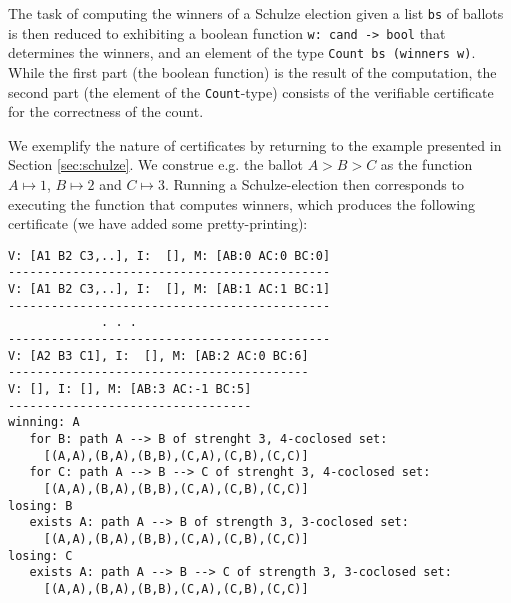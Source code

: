 \documentclass{llncs}
\begin{document}
The task of computing the winners of a Schulze election given a list
\texttt{bs} of ballots is then
reduced to exhibiting a boolean function \texttt{w: cand -> bool}
that determines the winners, and an element of the type
\texttt{Count bs (winners w)}. While the first part (the boolean
function) is the result of the computation, the second part (the
element of the \texttt{Count}-type) consists of the verifiable
certificate for the correctness of the count.

We exemplify the nature of certificates by returning to the example
presented in Section \ref{sec:schulze}. We construe e.g. the ballot
$A > B > C$ as the function $A \mapsto 1$, $B \mapsto 2$ and $C
\mapsto 3$. Running a Schulze-election then corresponds to executing
the function that computes winners, which produces the following
certificate (we have added some pretty-printing):

\begin{verbatim}
V: [A1 B2 C3,..], I:  [], M: [AB:0 AC:0 BC:0]
---------------------------------------------
V: [A1 B2 C3,..], I:  [], M: [AB:1 AC:1 BC:1]
---------------------------------------------
             . . .
---------------------------------------------
V: [A2 B3 C1], I:  [], M: [AB:2 AC:0 BC:6]
------------------------------------------
V: [], I: [], M: [AB:3 AC:-1 BC:5]
----------------------------------
winning: A
   for B: path A --> B of strenght 3, 4-coclosed set:
     [(A,A),(B,A),(B,B),(C,A),(C,B),(C,C)]
   for C: path A --> B --> C of strenght 3, 4-coclosed set:
     [(A,A),(B,A),(B,B),(C,A),(C,B),(C,C)] 
losing: B
   exists A: path A --> B of strength 3, 3-coclosed set:
     [(A,A),(B,A),(B,B),(C,A),(C,B),(C,C)]
losing: C
   exists A: path A --> B --> C of strength 3, 3-coclosed set:
     [(A,A),(B,A),(B,B),(C,A),(C,B),(C,C)]
\end{verbatim}
\end{document}
